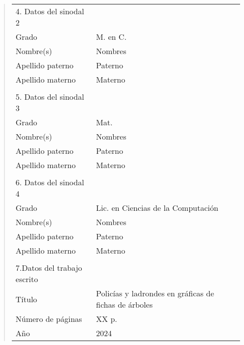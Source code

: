 {\begin{quote}
\begin{tabular}{lll}
4. Datos del sinodal 2      & {}                                          \\
Grado                       & M. en C.                                    \\
Nombre(s)                   & Nombres                                     \\
Apellido paterno            & Paterno                                     \\
Apellido materno            & Materno                                     \\
{}                          & {}                                          \\
5. Datos del sinodal 3      & {}                                          \\
Grado                       & Mat.                                        \\
Nombre(s)                   & Nombres                                     \\
Apellido paterno            & Paterno                                     \\
Apellido materno            & Materno                                     \\
{}                          & {}                                          \\
6. Datos del sinodal 4      & {}                                          \\
Grado                       & Lic. en Ciencias de la Computaci\'on        \\
Nombre(s)                   & Nombres                                     \\
Apellido paterno            & Paterno                                     \\
Apellido materno            & Materno                                     \\
{}                          & {}                                          \\
7.Datos del trabajo escrito & {}                                          \\
T\'itulo                    & Polic\'ias y ladrondes en gr\'aficas de
                              fichas de \'arboles                         \\
N\'umero de p\'aginas       & XX p.                                       \\
A\~no                       & 2024                                        \\
\end{tabular}
\end{quote}
}
